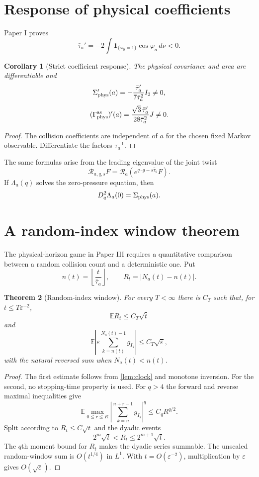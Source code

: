 \documentclass[11pt,reqno]{amsart}
\newtheorem{theorem}{Theorem}[section]
\newtheorem{corollary}[theorem]{Corollary}
\theoremstyle{definition}
\theoremstyle{remark}
\newcommand{\E}{\mathbb E}
\newcommand{\abs}[1]{\left\lvert #1\right\rvert}
\begin{document}
\section{Response of physical coefficients}\label{sec:response}

Paper I proves
\[
 \bar\tau_a'
 =
 -2\int
 \mathbf1_{\{\omega_0=1\}}\cos\varphi_a\,d\nu<0.
\]

\begin{corollary}[Strict coefficient response]\label{cor:response}
The physical covariance and area are differentiable and
\[
 \Sigma_{\rm phys}'(a)
 =-\frac{\bar\tau_a'}{7\bar\tau_a^2}I_2\ne0,
\]
\[
 (\Gamma_{\rm phys}^{\rm as})'(a)
 =\frac{\sqrt3\,\bar\tau_a'}{28\bar\tau_a^2}J\ne0.
\]
\end{corollary}

\begin{proof}
The collision coefficients are independent of $a$ for the chosen fixed
Markov observable.  Differentiate the factors $\bar\tau_a^{-1}$.
\end{proof}

The same formulas arise from the leading eigenvalue of the joint twist
\[
 \mathcal R_{a,q,s}F
 =
 \mathcal R_a(e^{q\cdot g-s\widehat\tau_a}F).
\]
If $\Lambda_a(q)$ solves the zero-pressure equation, then
\[
 D_q^2\Lambda_a(0)=\Sigma_{\rm phys}(a).
\]

\section{A random-index window theorem}\label{sec:random-window}

The physical-horizon game in Paper III requires a quantitative comparison
between a random collision count and a deterministic one.  Put
\[
 n(t)=\left\lfloor\frac{t}{\bar\tau_a}\right\rfloor,\qquad
 R_t=\abs{N_a(t)-n(t)}.
\]

\begin{theorem}[Random-index window]\label{thm:window}
For every $T<\infty$ there is $C_T$ such that, for $t\le T\varepsilon^{-2}$,
\[
 \E R_t\le C_T\sqrt t
\]
and
\[
 \E\abs{
 \varepsilon\sum_{k=n(t)}^{N_a(t)-1}g_{I_k}}
 \le C_T\sqrt\varepsilon,
\]
with the natural reversed sum when $N_a(t)<n(t)$.
\end{theorem}

\begin{proof}
The first estimate follows from \cref{lem:clock} and monotone inversion.
For the second, no stopping-time property is used.  For $q>4$ the forward and
reverse maximal inequalities give
\[
 \E\max_{0\le r\le R}
 \abs{\sum_{k=n}^{n+r-1}g_{I_k}}^q
 \le C_qR^{q/2}.
\]
Split according to $R_t\le C\sqrt t$ and the dyadic events
\[
 2^m\sqrt t<R_t\le2^{m+1}\sqrt t.
\]
The $q$th moment bound for $R_t$ makes the dyadic series summable.  The
unscaled random-window sum is $O(t^{1/4})$ in $L^1$.  With
$t=O(\varepsilon^{-2})$, multiplication by $\varepsilon$ gives
$O(\sqrt\varepsilon)$.
\end{proof}
\end{document}
